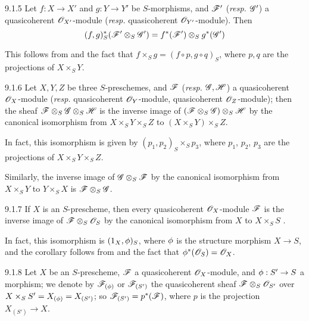 \documentclass[10pt,oneside]{book}
\begin{document}
\begin{envs}[Corollary]{9.1.5}
\label{cor-1.9.1.5}
Let $f:X\to X'$ and $g:Y\to Y'$ be
$S$-morphisms, and $\mathscr{F}'$ (\emph{resp.} $\mathscr{G}'$) a quasicoherent
$\mathscr{O}_{X'}$-module (\emph{resp.} quasicoherent $\mathscr{O}_{Y'}$-module). Then
\[
  (f,g)^*_S(\mathscr{F}'\otimes_S\mathscr{G}')=f^*(\mathscr{F}')\otimes_S g^*(\mathscr{G}')
\]
\end{envs}

This follows from  and the fact that $f\times_S g=(f\circ p, g\circ q)_S$,
where $p,q$ are the projections of $X\times_S Y$.

\begin{envs}[Corollary]{9.1.6}
\label{cor-1.9.1.6}
Let $X,Y,Z$ be three $S$-preschemes, and $\mathscr{F}$ (\emph{resp.} $\mathscr{G},\mathscr{H}$) a
quasicoherent $\mathscr{O}_X$-module (\emph{resp.} quasicoherent $\mathscr{O}_Y$-module, quasicoherent
$\mathscr{O}_Z$-module); then the sheaf $\mathscr{F}\otimes_S\mathscr{G}\otimes_S\mathscr{H}$ is the inverse image
of $(\mathscr{F}\otimes_S\mathscr{G})\otimes_S\mathscr{H}$ by the canonical isomorphism from
$X\times_S Y\times_S Z$ to $(X\times_S Y)\times_S Z$.
\end{envs}

In fact, this isomorphism is given by $(p_1,p_2)_S\times_S p_3$, where $p_1$, $p_2$, $p_3$
are the projections of $X\times_S Y\times_S Z$.

Similarly, the inverse image of $\mathscr{G}\otimes_S\mathscr{F}$ by the canonical isomorphism from
$X\times_S Y$ to $Y\times_S X$ is $\mathscr{F}\otimes_S\mathscr{G}$.

\begin{envs}[Corollary]{9.1.7}
\label{cor-1.9.1.7}
If $X$ is an $S$-prescheme, then every quasicoherent $\mathscr{O}_X$-module $\mathscr{F}$ is the inverse
image of $\mathscr{F}\otimes_S\mathscr{O}_S$ by the canonical isomorphism from $X$ to $X\times_S S$
.
\end{envs}

In fact, this isomorphism is $(1_X,\phi)_S$, where $\phi$ is the structure morphism
$X\to S$, and the corollary follows from  and the fact that
$\phi^*(\mathscr{O}_S)=\mathscr{O}_X$.

\begin{env}{9.1.8}
\label{env-1.9.1.8}
Let $X$ be an $S$-prescheme, $\mathscr{F}$ a quasicoherent
$\mathscr{O}_X$-module, and $\phi:S'\to S$ a morphism; we denote by
$\mathscr{F}_{(\phi)}$ or $\mathscr{F}_{(S')}$ the quasicoherent sheaf
$\mathscr{F}\otimes_S\mathscr{O}_{S'}$ over $X\times_S S'=X_{(\phi)}=X_{(S')}$; so
$\mathscr{F}_{(S')}=p^*(\mathscr{F})$, where $p$ is the projection $X_{(S')}\to X$.
\end{env}
\end{document}

